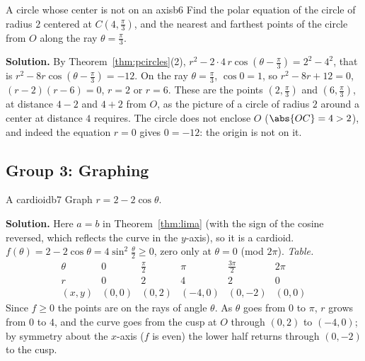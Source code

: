 \documentclass[11pt]{article}
\begin{document}
\begin{exmp}{A circle whose center is not on an axis}{b6}
Find the polar equation of the circle of radius $2$ centered at $C\left(4,\frac\pi3\right)$, and the nearest and farthest points of the circle from $O$ along the ray $\theta=\frac\pi3$.

\textbf{Solution.} By Theorem~\ref{thm:pcircles}(2), $r^2-2\cdot4\,r\cos\left(\theta-\frac\pi3\right)=2^2-4^2$, that is $r^2-8r\cos\left(\theta-\frac\pi3\right)=-12$. On the ray $\theta=\frac\pi3$, $\cos0=1$, so $r^2-8r+12=0$, $(r-2)(r-6)=0$, $r=2$ or $r=6$. These are the points $\left(2,\frac\pi3\right)$ and $\left(6,\frac\pi3\right)$, at distance $4-2$ and $4+2$ from $O$, as the picture of a circle of radius $2$ around a center at distance $4$ requires. The circle does not enclose $O$ ($\abs{OC}=4>2$), and indeed the equation $r=0$ gives $0=-12$: the origin is not on it.
\end{exmp}

\subsection*{Group 3: Graphing}

\begin{exmp}{A cardioid}{b7}
Graph $r=2-2\cos\theta$.

\textbf{Solution.} Here $a=b$ in Theorem~\ref{thm:lima} (with the sign of the cosine reversed, which reflects the curve in the $y$-axis), so it is a cardioid. $f(\theta)=2-2\cos\theta=4\sin^2\frac\theta2\ge0$, zero only at $\theta=0$ (mod $2\pi$). \emph{Table.}
\[
\begin{array}{c|ccccc}
\theta&0&\frac\pi2&\pi&\frac{3\pi}2&2\pi\\\hline
r&0&2&4&2&0\\
(x,y)&(0,0)&(0,2)&(-4,0)&(0,-2)&(0,0)
\end{array}
\]
Since $f\ge0$ the points are on the rays of angle $\theta$. As $\theta$ goes from $0$ to $\pi$, $r$ grows from $0$ to $4$, and the curve goes from the cusp at $O$ through $(0,2)$ to $(-4,0)$; by symmetry about the $x$-axis ($f$ is even) the lower half returns through $(0,-2)$ to the cusp.
\end{exmp}
\end{document}
